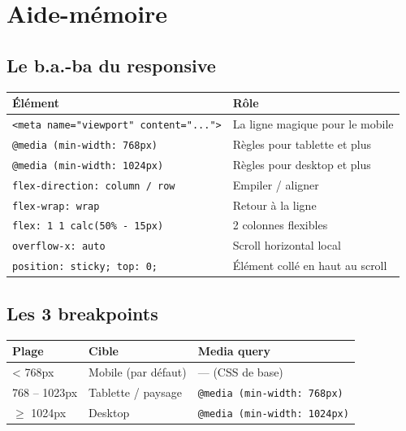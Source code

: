 \documentclass[11pt,a4paper]{article}
\begin{document}
\newpage

\section{Aide-mémoire}

\subsection{Le b.a.-ba du responsive}

\begin{center}
\begin{tabular}{@{}lp{8cm}@{}}
\toprule
\textbf{Élément}                                & \textbf{Rôle} \\
\midrule
\texttt{<meta name="viewport" content="...">}   & La ligne magique pour le mobile \\
\addlinespace
\texttt{@media (min-width: 768px)}              & Règles pour tablette et plus \\
\texttt{@media (min-width: 1024px)}             & Règles pour desktop et plus \\
\addlinespace
\texttt{flex-direction: column / row}           & Empiler / aligner \\
\texttt{flex-wrap: wrap}                        & Retour à la ligne \\
\texttt{flex: 1 1 calc(50\% - 15px)}            & 2 colonnes flexibles \\
\addlinespace
\texttt{overflow-x: auto}                       & Scroll horizontal local \\
\texttt{position: sticky; top: 0;}              & Élément collé en haut au scroll \\
\bottomrule
\end{tabular}
\end{center}

\subsection{Les 3 breakpoints}

\begin{center}
\begin{tabular}{@{}lll@{}}
\toprule
\textbf{Plage}        & \textbf{Cible}        & \textbf{Media query} \\
\midrule
< 768px               & Mobile (par défaut) & --- (CSS de base) \\
768 -- 1023px         & Tablette / paysage   & \texttt{@media (min-width: 768px)} \\
$\geq$ 1024px         & Desktop              & \texttt{@media (min-width: 1024px)} \\
\bottomrule
\end{tabular}
\end{center}
\end{document}
